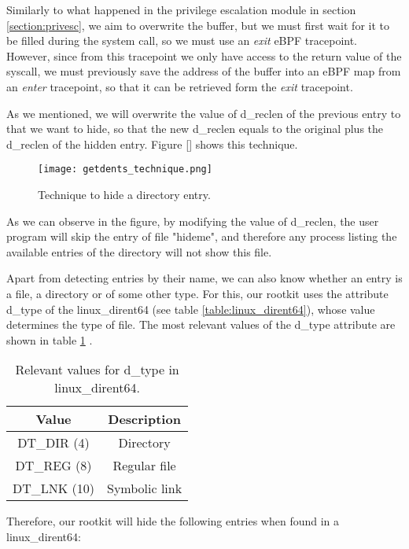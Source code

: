 Similarly to what happened in the privilege escalation module in section \ref{section:privesc}, we aim to overwrite the buffer, but we must first wait for it to be filled during the system call, so we must use an \textit{exit} eBPF tracepoint. However, since from this tracepoint we only have access to the return value of the syscall, we must previously save the address of the buffer into an eBPF map from an \textit{enter} tracepoint, so that it can be retrieved form the \textit{exit} tracepoint. 

As we mentioned, we will overwrite the value of d\_reclen of the previous entry to that we want to hide, so that the new d\_reclen equals to the original plus the d\_reclen of the hidden entry. Figure \ref{} shows this technique.

\begin{figure}[htbp]
	\centering
	\texttt{[image: getdents\_technique.png]}
	\caption{Technique to hide a directory entry.}
	\label{fig:getdents_technique}
\end{figure}

As we can observe in the figure, by modifying the value of d\_reclen, the user program will skip the entry of file "hideme", and therefore any process listing the available entries of the directory will not show this file.

Apart from detecting entries by their name, we can also know whether an entry is a file, a directory or of some other type. For this, our rootkit uses the attribute d\_type of the linux\_dirent64 (see table \ref{table:linux_dirent64}), whose value determines the type of file. The most relevant values of the d\_type attribute are shown in table \ref{table:dtype_values} \cite{dtype_dirent}.

\begin{table}[htbp]
\begin{tabular}{|c|c|}
\hline
\textbf{Value} & \textbf{Description} \\
\hline
\hline
DT\_DIR (4) & Directory\\
\hline
DT\_REG (8) & Regular file\\
\hline
DT\_LNK (10) & Symbolic link\\
\hline
\end{tabular}
\caption{Relevant values for d\_type in linux\_dirent64.}
\label{table:dtype_values}
\end{table}

Therefore, our rootkit will hide the following entries when found in a linux\_dirent64:

